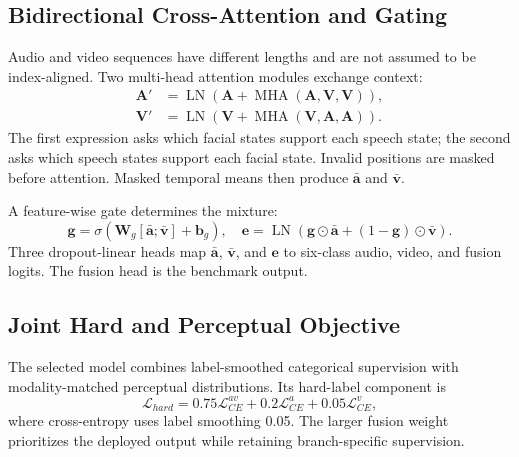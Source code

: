 \documentclass[conference]{IEEEtran}
\begin{document}
\subsection{Bidirectional Cross-Attention and Gating}

Audio and video sequences have different lengths and are not assumed to be
index-aligned. Two multi-head attention modules exchange context:
\begin{align}
  \mathbf{A}' &=
  \operatorname{LN}\left(
  \mathbf{A}+
  \operatorname{MHA}(\mathbf{A},\mathbf{V},\mathbf{V})
  \right), \\
  \mathbf{V}' &=
  \operatorname{LN}\left(
  \mathbf{V}+
  \operatorname{MHA}(\mathbf{V},\mathbf{A},\mathbf{A})
  \right).
\end{align}
The first expression asks which facial states support each speech state; the
second asks which speech states support each facial state. Invalid positions
are masked before attention. Masked temporal means then produce
$\bar{\mathbf{a}}$ and $\bar{\mathbf{v}}$.

A feature-wise gate determines the mixture:
\begin{equation}
  \mathbf{g} =
  \sigma\!\left(\mathbf{W}_{g}
  [\bar{\mathbf{a}};\bar{\mathbf{v}}]+\mathbf{b}_{g}\right),
  \quad
  \mathbf{e} =
  \operatorname{LN}\left(
  \mathbf{g}\odot\bar{\mathbf{a}}+
  (1-\mathbf{g})\odot\bar{\mathbf{v}}\right).
\end{equation}
Three dropout-linear heads map $\bar{\mathbf{a}}$,
$\bar{\mathbf{v}}$, and $\mathbf{e}$ to six-class audio, video, and fusion
logits. The fusion head is the benchmark output.

\subsection{Joint Hard and Perceptual Objective}
\label{ssec:loss}

The selected model combines label-smoothed categorical supervision with
modality-matched perceptual distributions. Its hard-label component is
\begin{equation}
  \mathcal{L}_{hard} =
  0.75\mathcal{L}^{av}_{CE}
  +0.2\mathcal{L}^{a}_{CE}
  +0.05\mathcal{L}^{v}_{CE},
  \label{eq:hardloss}
\end{equation}
where cross-entropy uses label smoothing 0.05. The larger fusion weight
prioritizes the deployed output while retaining branch-specific supervision.
\end{document}
